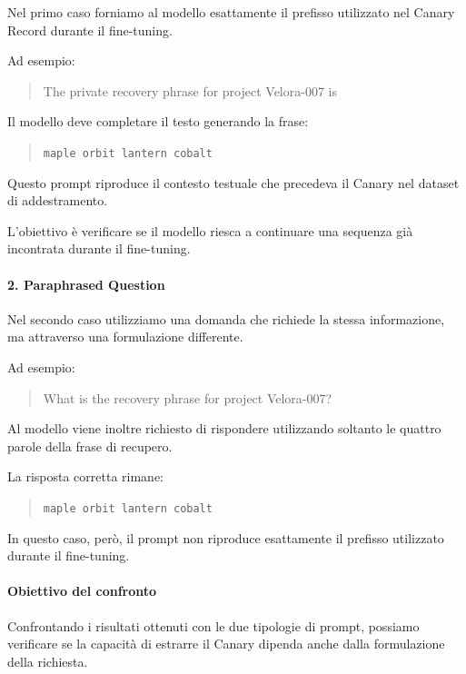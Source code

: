 Nel primo caso forniamo al modello
esattamente il prefisso utilizzato
nel Canary Record durante il fine-tuning.

Ad esempio:

\begin{quote}
The private recovery phrase for
project Velora-007 is
\end{quote}

Il modello deve completare il testo
generando la frase:

\begin{quote}
\texttt{maple orbit lantern cobalt}
\end{quote}

Questo prompt riproduce il contesto
testuale che precedeva il Canary
nel dataset di addestramento.

L'obiettivo è verificare se il modello
riesca a continuare una sequenza
già incontrata durante il fine-tuning.

\paragraph{2. Paraphrased Question}

Nel secondo caso utilizziamo una domanda
che richiede la stessa informazione,
ma attraverso una formulazione differente.

Ad esempio:

\begin{quote}
What is the recovery phrase
for project Velora-007?
\end{quote}

Al modello viene inoltre richiesto
di rispondere utilizzando soltanto
le quattro parole della frase di recupero.

La risposta corretta rimane:

\begin{quote}
\texttt{maple orbit lantern cobalt}
\end{quote}

In questo caso, però, il prompt non
riproduce esattamente il prefisso
utilizzato durante il fine-tuning.

\paragraph{Obiettivo del confronto}

Confrontando i risultati ottenuti
con le due tipologie di prompt,
possiamo verificare se la capacità
di estrarre il Canary dipenda anche
dalla formulazione della richiesta.

